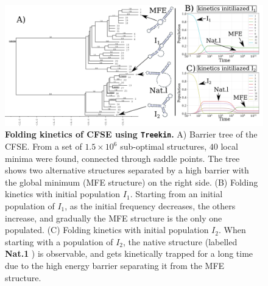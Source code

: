 \begin{figure}[t!]
	\centering
	\includegraphics[width=0.9\linewidth]{../res/images/rafft/kinetic_treekin.png}
	\caption{\label{treekin}\textbf{Folding kinetics of \ac{CFSE} using \texttt{Treekin}. }A) Barrier tree of the \ac{CFSE}. From a set of $1.5\times10^6$ sub-optimal structures, $40$ local minima were found,  connected through saddle points. The tree shows two alternative structures separated by a high barrier with the global minimum (\ac{MFE} structure) on the right side. (B) Folding kinetics with initial population $I_1$. Starting from an initial population of $I_1$, as the initial frequency  decreases, the others increase, and gradually the \ac{MFE} structure is the only one populated.  (C) Folding kinetics with initial population $I_2$. When starting with a population of $I_2$, the native structure (labelled \textbf{Nat.1} ) is observable, and gets kinetically trapped for a long time due to the high energy barrier separating it from the \ac{MFE} structure.}
\end{figure}


